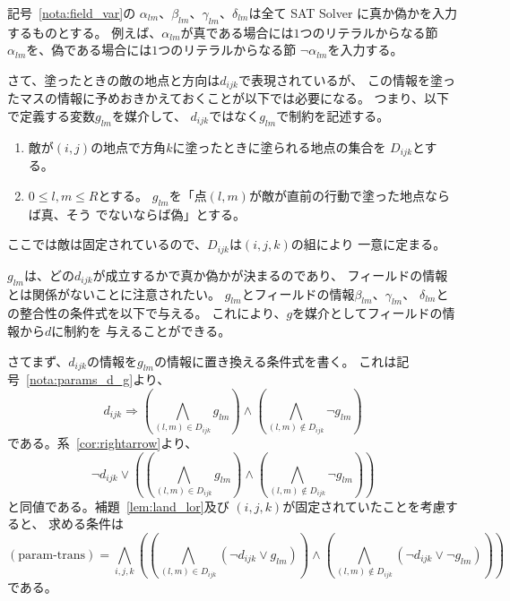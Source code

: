 \begin{rem} \label{rem:chikaku}
 記号~\ref{nota:field_var}の
 $\alpha_{lm}$、$\beta_{lm}$、$\gamma_{lm}$、$\delta_{lm}$は全て
 SAT Solver に真か偽かを入力するものとする。
 例えば、$\alpha_{lm}$が真である場合には$1$つのリテラルからなる節
 $\alpha_{lm}$を、偽である場合には$1$つのリテラルからなる節
 $\lnot \alpha_{lm}$を入力する。
\end{rem}

さて、塗ったときの敵の地点と方向は$d_{ijk}$で表現されているが、
この情報を塗ったマスの情報に予めおきかえておくことが以下では必要になる。
つまり、以下で定義する変数$g_{lm}$を媒介して、
$d_{ijk}$ではなく$g_{lm}$で制約を記述する。

\begin{nota}[塗った地点の情報を媒介する変数] \label{nota:params_d_g}
 \begin{enumerate}[1.]
  \item 敵が$(i, j)$の地点で方角$k$に塗ったときに塗られる地点の集合を
        $D_{ijk}$とする。
  \item $0 \leq l, m \leq R$とする。
        $g_{lm}$を「点$(l, m)$が敵が直前の行動で塗った地点ならば真、そう
        でないならば偽」とする。
 \end{enumerate}
\end{nota}

\begin{rem}
 ここでは敵は固定されているので、$D_{ijk}$は$(i, j, k)$の組により
 一意に定まる。
\end{rem}

\begin{rem} 
 $g_{lm}$は、どの$d_{ijk}$が成立するかで真か偽かが決まるのであり、
 フィールドの情報とは関係がないことに注意されたい。
 $g_{lm}$とフィールドの情報$\beta_{lm}$、$\gamma_{lm}$、
 $\delta_{lm}$との整合性の条件式を以下で与える。
 これにより、$g$を媒介としてフィールドの情報から$d$に制約を
 与えることができる。
\end{rem}

さてまず、$d_{ijk}$の情報を$g_{lm}$の情報に置き換える条件式を書く。
これは記号~\ref{nota:params_d_g}より、
\[
 d_{ijk} \Rightarrow \left( \bigwedge_{(l, m) \in D_{ijk}} g_{lm} \right)
 \land \left( \bigwedge_{(l, m) \not\in D_{ijk}} \lnot g_{lm} \right)
\]
である。系~\ref{cor:rightarrow}より、
\[
 \lnot d_{ijk} \lor 
 \left(
 \left( \bigwedge_{(l, m) \in D_{ijk}} g_{lm} \right)
 \land \left( \bigwedge_{(l, m) \not\in D_{ijk}} \lnot g_{lm} \right)
 \right)
\]
と同値である。補題~\ref{lem:land_lor}及び
$(i, j, k)$が固定されていたことを考慮すると、
求める条件は
\begin{equation}
 (\text{param-trans}) = \bigwedge_{i, j, k} \left(
                            \left( \bigwedge_{(l, m) \in D_{ijk}}
                             (\lnot d_{ijk} \lor g_{lm}) \right)
                            \land
                            \left( \bigwedge_{(l, m) \not\in D_{ijk}}
                             (\lnot d_{ijk} \lor \lnot g_{lm}) \right)
                           \right)
\end{equation}
である。

